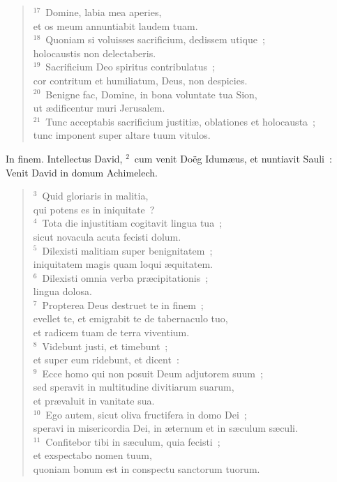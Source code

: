 \begin{flushleft}
\begin{verse}
${}^{17}$~Domine, labia mea aperies,\\ et os meum annuntiabit laudem tuam.\\
${}^{18}$~Quoniam si voluisses sacrificium, dedissem utique~;\\ holocaustis non delectaberis.\\
${}^{19}$~Sacrificium Deo spiritus contribulatus~;\\ cor contritum et humiliatum, Deus, non despicies.\\
${}^{20}$~Benigne fac, Domine, in bona voluntate tua Sion,\\ ut \ae dificentur muri Jerusalem.\\
${}^{21}$~Tunc acceptabis sacrificium justiti\ae , oblationes et holocausta~;\\ tunc imponent super altare tuum vitulos.\end{verse}\end{flushleft}



\bchapter
\lettrine[lines=3,image=true,loversize=0.05,lraise=-0.03]{I}{}n finem. Intellectus David,
${}^{2}$~cum venit Do\"eg Idum\ae us, et nuntiavit Sauli~: Venit David in domum Achimelech.
\begin{flushleft}\begin{verse}${}^{3}$~Quid gloriaris in malitia,\\ qui potens es in iniquitate~?\\
${}^{4}$~Tota die injustitiam cogitavit lingua tua~;\\ sicut novacula acuta fecisti dolum.\\
${}^{5}$~Dilexisti malitiam super benignitatem~;\\ iniquitatem magis quam loqui \ae quitatem.\\
${}^{6}$~Dilexisti omnia verba pr\ae cipitationis~;\\ lingua dolosa.\\
${}^{7}$~Propterea Deus destruet te in finem~;\\ evellet te, et emigrabit te de tabernaculo tuo,\\ et radicem tuam de terra viventium.\\
${}^{8}$~Videbunt justi, et timebunt~;\\ et super eum ridebunt, et dicent~:\\
${}^{9}$~Ecce homo qui non posuit Deum adjutorem suum~;\\ sed speravit in multitudine divitiarum suarum,\\ et pr\ae valuit in vanitate sua.\\
${}^{10}$~Ego autem, sicut oliva fructifera in domo Dei~;\\ speravi in misericordia Dei, in \ae ternum et in s\ae culum s\ae culi.\\
${}^{11}$~Confitebor tibi in s\ae culum, quia fecisti~;\\ et exspectabo nomen tuum,\\ quoniam bonum est in conspectu sanctorum tuorum.\end{verse}\end{flushleft}



